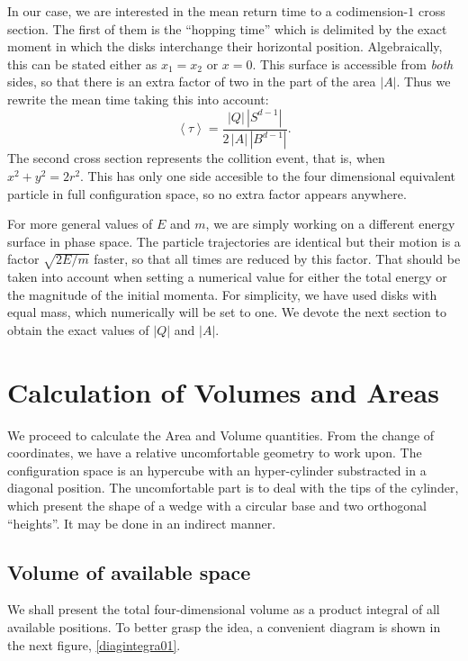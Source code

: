 \documentclass[letterpaper,12pt]{amsart}
\newcommand{\mean}[1]{\left \langle #1 \right \rangle}
\begin{document}
In our case, we are interested in the 
mean return time to a codimension-$1$ cross section.
The first of them is the ``hopping time'' 
which is delimited by the exact moment
in which the disks interchange their horizontal position. 
Algebraically, this can be stated either as
$x_1 = x_2$ or $x=0$.
This surface is accessible from \emph{both} sides, 
so that there is an extra factor of two in the part of the area 
$|A|$. Thus 
we rewrite the mean time taking this into account: 
\begin{equation}
 \mean{\tau} = \frac{|Q| \, |S^{d-1}|} {2 \, |A| \, |B^{d-1}|}.	
\end{equation}
The second cross section represents the collition
event, that is, when $x^2+y^2=2r^2$. This has only one
side accesible to the four dimensional
equivalent particle in full configuration space,
so no extra factor appears anywhere.

For more general values of $E$ and $m$, 
we are simply working on a different energy surface in phase space. 
The particle trajectories are identical but their motion is a factor
$\sqrt{2E/m}$ faster, so that all times are reduced by this factor.
That should be taken into account when setting a numerical value
for either the total energy or the magnitude of the initial momenta.
For simplicity, we have used disks with equal mass, which numerically
will be set to one. We devote the next section
to obtain the exact values of $|Q|$ and $|A|$.


\section{Calculation of Volumes and Areas}

We proceed to calculate the Area and Volume quantities. 
From the change of coordinates,
we have a relative uncomfortable geometry to work upon. The configuration
space is an hypercube with an hyper-cylinder substracted in a diagonal position.
The uncomfortable part is to deal with the tips of the cylinder, which
present the  shape of a wedge with a circular base and two 
orthogonal ``heights''. It may be done in an indirect manner.


\subsection{Volume of available space}


We shall present the total four-dimensional volume as a product integral
of all available positions. To better grasp the idea, a convenient
diagram is shown in the next figure, \ref{diagintegra01}.
\end{document}
